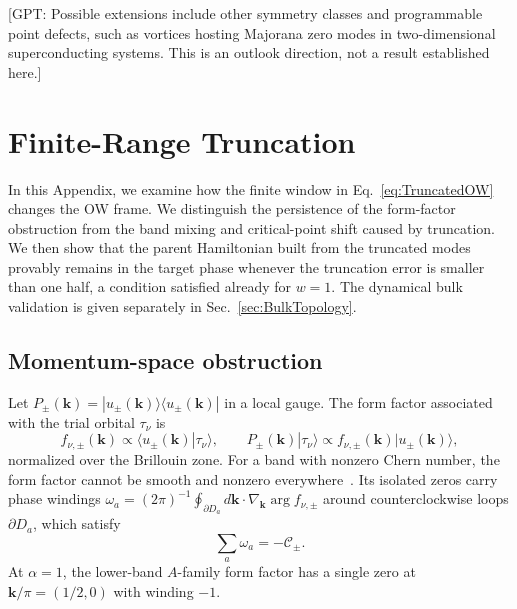 \documentclass[aps,prb,10pt,twocolumn,superscriptaddress,longbibliography,floatfix]{revtex4-2}
\newcommand{\mc}[1]{\mathcal{#1}}
\newcommand{\bk}{\boldsymbol k}
\newcommand{\GPT}[1]{{\color{magenta}[GPT: #1]}}
\newcommand{\claudeadd}[1]{{\color{orange}#1}}
\begin{document}
\GPT{Possible extensions include other symmetry classes and programmable point defects, such as vortices hosting Majorana zero modes in two-dimensional superconducting systems. This is an outlook direction, not a result established here.}


\FloatBarrier
\appendix
\setcounter{figure}{0}
\renewcommand{\thefigure}{A\arabic{figure}}
\renewcommand{\theHfigure}{A\arabic{figure}}

{\color{blue}\section{Finite-Range Truncation}
\label{app:Truncation}}

{\color{blue}
In this Appendix, we examine how the finite window in Eq.~\eqref{eq:TruncatedOW} changes the OW frame. We distinguish the persistence of the form-factor obstruction from the band mixing and critical-point shift caused by truncation. \claudeadd{We then show that the parent Hamiltonian built from the truncated modes provably remains in the target phase whenever the truncation error is smaller than one half, a condition satisfied already for $w=1$.} The dynamical bulk validation is given separately in Sec.~\ref{sec:BulkTopology}.
}

\subsection{Momentum-space obstruction}

Let $P_\pm(\bk)=|u_\pm(\bk)\rangle\langle u_\pm(\bk)|$ in a local gauge. The form factor associated with the trial orbital $\tau_\nu$ is
\begin{equation}
    f_{\nu,\pm}(\bk)\propto\langle u_\pm(\bk)|\tau_\nu\rangle,
    \qquad
    P_\pm(\bk)|\tau_\nu\rangle\propto f_{\nu,\pm}(\bk)|u_\pm(\bk)\rangle,
    \label{eq:FormFactor}
\end{equation}
normalized over the Brillouin zone. For a band with nonzero Chern number, the form factor cannot be smooth and nonzero everywhere~\cite{BhuiyanPanJian2026}. Its isolated zeros carry phase windings $\omega_a=(2\pi)^{-1}\oint_{\partial D_a}d\bk\cdot\nabla_{\bk}\arg f_{\nu,\pm}$ around counterclockwise loops $\partial D_a$, which satisfy
\begin{equation}
    \sum_a\omega_a=-\mc C_\pm.
    \label{eq:ZeroWinding}
\end{equation}
At $\alpha=1$, the lower-band $A$-family form factor has a single zero at $\bk/\pi=(1/2,0)$ with winding $-1$.
\end{document}
